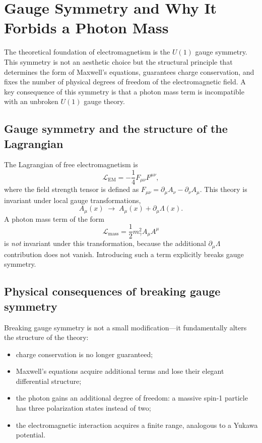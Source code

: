 \section{Gauge Symmetry and Why It Forbids a Photon Mass}

The theoretical foundation of electromagnetism is the $U(1)$ gauge symmetry. 
This symmetry is not an aesthetic choice but the structural principle that 
determines the form of Maxwell’s equations, guarantees charge conservation, 
and fixes the number of physical degrees of freedom of the electromagnetic 
field. A key consequence of this symmetry is that a photon mass term is 
incompatible with an unbroken $U(1)$ gauge theory.

\subsection*{Gauge symmetry and the structure of the Lagrangian}
The Lagrangian of free electromagnetism is
\[
\mathcal{L}_{\mathrm{EM}} = -\frac{1}{4}F_{\mu\nu}F^{\mu\nu},
\]
where the field strength tensor is defined as 
$F_{\mu\nu} = \partial_\mu A_\nu - \partial_\nu A_\mu$.
This theory is invariant under local gauge transformations,
\[
A_\mu(x) \;\rightarrow\; A_\mu(x) + \partial_\mu \Lambda(x).
\]
A photon mass term of the form
\[
\mathcal{L}_{\mathrm{mass}} = \frac{1}{2}m_\gamma^2 A_\mu A^\mu
\]
is \emph{not} invariant under this transformation, because the additional 
$\partial_\mu \Lambda$ contribution does not vanish. Introducing such a 
term explicitly breaks gauge symmetry.

\subsection*{Physical consequences of breaking gauge symmetry}
Breaking gauge symmetry is not a small modification—it fundamentally alters 
the structure of the theory:

\begin{itemize}
	\item charge conservation is no longer guaranteed;
	\item Maxwell’s equations acquire additional terms and lose their 
	elegant differential structure;
	\item the photon gains an additional degree of freedom: a massive 
	spin-1 particle has three polarization states instead of two;
	\item the electromagnetic interaction acquires a finite range, 
	analogous to a Yukawa potential.
\end{itemize}


